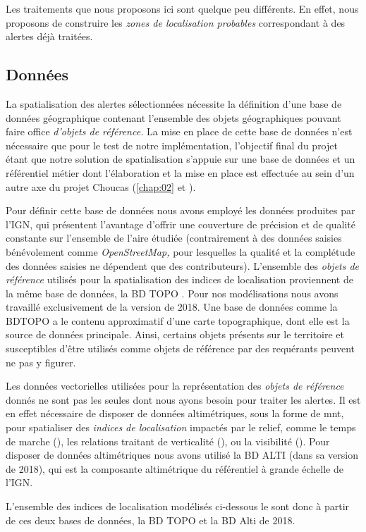 Les traitements que nous proposons ici sont quelque peu différents. En
effet, nous proposons de construire les \emph{zones de localisation
  probables} correspondant à des alertes déjà traitées.

\subsection{Données}

La spatialisation des alertes sélectionnées nécessite la définition
d'une base de données géographique contenant l'ensemble des objets
géographiques pouvant faire office \emph{d'objets de référence.} La
mise en place de cette base de données n'est nécessaire que pour le
test de notre implémentation, l'objectif final du projet étant que
notre solution de spatialisation s'appuie sur une base de données et
un référentiel métier dont l’élaboration et la mise en place est
effectuée au sein d'un autre axe du projet Choucas (\autoref{chap:02}
et \cite{VanDamme2019}).

Pour définir cette base de données nous avons employé les données
produites par l'IGN, qui présentent l'avantage d'offrir une couverture
de précision et de qualité constante sur l'ensemble de l'aire étudiée
(contrairement à des données saisies bénévolement comme
\emph{OpenStreetMap,} pour lesquelles la qualité et la complétude des
données saisies ne dépendent que des contributeurs). L'ensemble des
\emph{objets de référence} utilisés pour la spatialisation des indices
de localisation proviennent de la même base de données, la BD TOPO
\autocite{IGN2020}. Pour nos modélisations nous avons travaillé
exclusivement de la version de 2018. Une base de données comme la
BDTOPO a le contenu approximatif d'une carte topographique, dont elle
est la source de données principale. Ainsi, certains objets présents
sur le territoire et susceptibles d'être utilisés comme objets de
référence par des requérants peuvent ne pas y figurer.

Les données vectorielles utilisées pour la représentation des
\emph{objets de référence} donnés ne sont pas les seules dont nous
ayons besoin pour traiter les alertes. Il est en effet nécessaire de
disposer de données altimétriques, sous la forme de \ac{mnt}, pour
spatialiser des \emph{indices de localisation} impactés par le relief,
comme le temps de marche (), les
relations traitant de verticalité (\eg {}), ou
la visibilité (). Pour disposer de
données altimétriques nous avons utilisé la BD ALTI (dans sa version
de 2018), qui est la composante altimétrique du référentiel à grande
échelle de l'IGN.

L'ensemble des indices de localisation modélisés ci-dessous le sont
donc à partir de ces deux bases de données, la BD TOPO et la BD Alti
de 2018.

